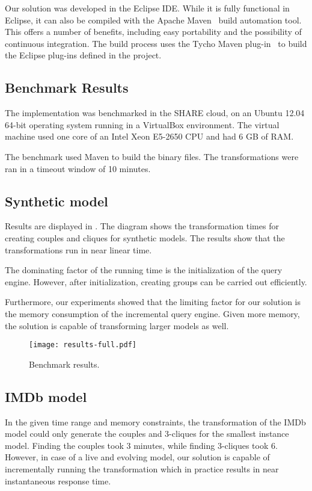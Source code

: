 Our solution was developed in the Eclipse IDE. While it is fully functional in Eclipse, it can also be compiled with the Apache Maven~\cite{Maven} build automation tool. This offers a number of benefits, including easy portability and the possibility of continuous integration. The build process uses the Tycho Maven plug-in~\cite{tycho} to build the Eclipse plug-ins defined in the project.

\subsection{Benchmark Results}

The implementation was benchmarked in the SHARE cloud, on an Ubuntu 12.04 64-bit operating system running in a VirtualBox environment. The virtual machine used one core of an Intel Xeon E5-2650 CPU and had 6 GB of RAM.

The benchmark used Maven to build the binary files. The transformations were ran in a timeout window of 10 minutes.

\subsection{Synthetic model}

Results are displayed in . The diagram shows the transformation times for creating couples and cliques for synthetic models. The results show that the transformations run in near linear time.

The dominating factor of the running time is the initialization of the query engine. However, after initialization, creating groups can be carried out efficiently.

Furthermore, our experiments showed that the limiting factor for our solution is the memory consumption of the incremental query engine. Given more memory, the solution is capable of transforming larger models as well.

\begin{figure}
	\centering
	\texttt{[image: results-full.pdf]}
	\caption{Benchmark results.}\label{fig:benchmark-results}
\end{figure}

\subsection{IMDb model}

In the given time range and memory constraints, the transformation of the IMDb model could only generate the couples and 3-cliques for the smallest instance model. Finding the couples took 3 minutes, while finding 3-cliques took 6. However, in case of a live and evolving model, our solution is capable of incrementally running the transformation which in practice results in near instantaneous response time.

